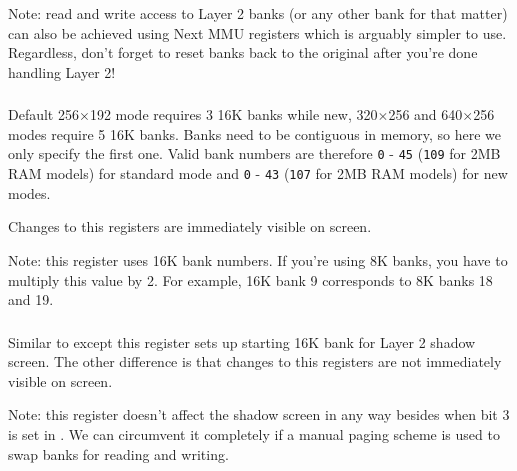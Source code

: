 Note: read and write access to Layer 2 banks (or any other bank for that matter) can also be achieved using Next MMU registers which is arguably simpler to use. Regardless, don't forget to reset banks back to the original after you're done handling Layer 2!


\subsubsection{}

\begin{NextPort}
\end{NextPort}

Default 256$\times$192 mode requires 3 16K banks while new, 320$\times$256 and 640$\times$256 modes require 5 16K banks. Banks need to be contiguous in memory, so here we only specify the first one. Valid bank numbers are therefore {\tt 0} - {\tt 45} ({\tt 109} for 2MB RAM models) for standard mode and {\tt 0} - {\tt 43} ({\tt 107} for 2MB RAM models) for new modes.

Changes to this registers are immediately visible on screen.

Note: this register uses 16K bank numbers. If you're using 8K banks, you have to multiply this value by 2. For example, 16K bank 9 corresponds to 8K banks 18 and 19.


\subsubsection{}

\begin{NextPort}
\end{NextPort}

Similar to  except this register sets up starting 16K bank for Layer 2 shadow screen. The other difference is that changes to this registers are not immediately visible on screen.

Note: this register doesn't affect the shadow screen in any way besides when bit 3 is set in . We can circumvent it completely if a manual paging scheme is used to swap banks for reading and writing.

\subsubsection{}


